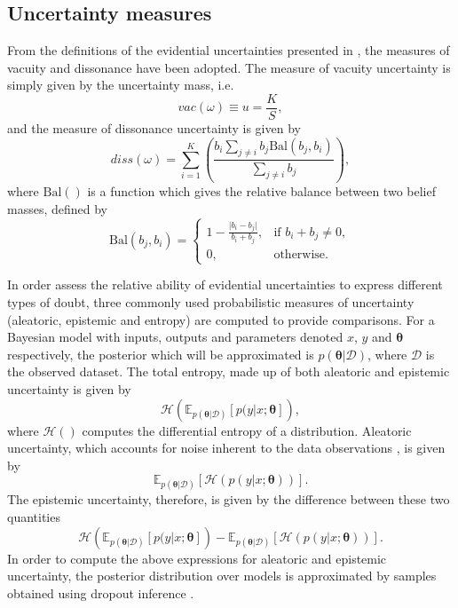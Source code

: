 \documentclass[
twocolumn,
]{ceurart}
\begin{document}
\subsection{Uncertainty measures}
From the definitions of the evidential uncertainties presented in \cite{Josang2018}, the measures of vacuity and dissonance have been adopted.
The measure of vacuity uncertainty is simply given by the uncertainty mass, i.e.
\begin{equation}
    vac(\omega)\equiv u = \frac{K}{S},
\label{eq::vacuity}
\end{equation}
and the measure of dissonance uncertainty is given by
\begin{equation}
    diss(\omega)=\sum_{i=1}^K\left(\frac{b_i\sum_{j\neq i}b_j\textrm{Bal}(b_j,b_i)}{\sum_{j\neq i}b_j}\right),
\end{equation}
where $\textrm{Bal}()$ is a function which gives the relative balance between two belief masses, defined by
\begin{equation}
    \textrm{Bal}(b_j,b_i)=\begin{cases}1-\frac{\vert b_i-b_j\vert}{b_i+b_j},&\text{if } b_i+b_j\neq0,\\
    0,&\text{otherwise.}\end{cases}
\end{equation}

In order assess the relative ability of evidential uncertainties to express different types of doubt, three commonly used probabilistic measures of uncertainty (aleatoric, epistemic and entropy) are computed to provide comparisons.
For a Bayesian model with inputs, outputs and parameters denoted $x$, $y$ and $\boldsymbol{\theta}$ respectively, the posterior which will be approximated is $p(\boldsymbol{\theta}\vert\mathcal{D})$, where $\mathcal{D}$ is the observed dataset.
The total entropy, made up of both aleatoric and epistemic uncertainty \cite{Depeweg2018} is given by
\begin{equation}
    \mathcal{H}\left(\mathbb{E}_{p(\boldsymbol{\theta}\vert \mathcal{D})}\left[p(y\vert x;\boldsymbol{\theta}\right]\right),
\end{equation}
where $\mathcal{H}()$ computes the differential entropy of a distribution.
Aleatoric uncertainty, which accounts for noise inherent to the data observations \cite{Kendall2017}, is given by
\begin{equation}
    \mathbb{E}_{p\left(\boldsymbol{\theta}\vert \mathcal{D}\right)}\left[\mathcal{H}(p(y\vert x; \boldsymbol{\theta}))\right].
\end{equation}
The epistemic uncertainty, therefore, is given by the difference between these two quantities
\begin{equation}
    \mathcal{H}\left(\mathbb{E}_{p(\boldsymbol{\theta}\vert \mathcal{D})}\left[p(y\vert x;\boldsymbol{\theta}\right]\right)-\mathbb{E}_{p\left(\boldsymbol{\theta}\vert \mathcal{D}\right)}\left[\mathcal{H}(p(y\vert x; \boldsymbol{\theta}))\right].
\label{eq::epistemic}
\end{equation}
In order to compute the above expressions for aleatoric and epistemic uncertainty, the posterior distribution over models is approximated by samples obtained using dropout inference \cite{Gal2016}.
\end{document}
